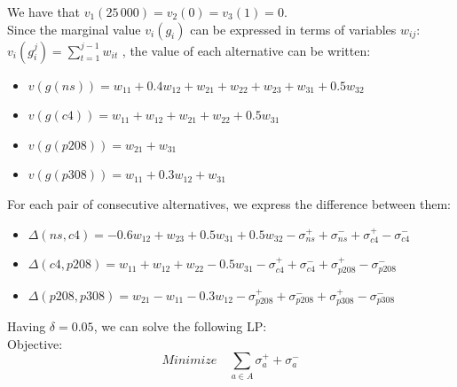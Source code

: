 \documentclass{report}
\begin{document}
We have that $v_1(25\,000) = v_2(0) = v_3(1) = 0$. \\
Since the marginal value $v_i(g_i)$ can be expressed in terms of variables $w_{ij}$: $v_i(g_i^{j}) = \sum _{t=1}^{j-1} w_{it}$ , the value of each alternative can be written: 
\begin{itemize}
\item $v(g(ns)) = w_{11} + 0.4w_{12} + w_{21} + w_{22} + w_{23} + w_{31} + 0.5w_{32}$
\item $v(g(c4)) = w_{11} + w_{12} + w_{21} + w_{22} + 0.5w_{31}$
\item $v(g(p208)) = w_{21} + w_{31} $
\item $v(g(p308)) = w_{11} + 0.3w_{12} + w_{31}$
\end{itemize}
For each pair of consecutive alternatives, we express the difference between them: 
\begin{itemize}
\item $\Delta (ns,c4) = -0.6w_{12} + w_{23} + 0.5w_{31} + 0.5w_{32} -\sigma _{ns}^{+} +\sigma _{ns}^{-} +\sigma _{c4}^{+} - \sigma _{c4}^{-} $
\item $\Delta (c4, p208) = w_{11} + w_{12} + w_{22} - 0.5w_{31} -\sigma _{c4}^{+} +\sigma _{c4}^{-} +\sigma _{p208}^{+} - \sigma _{p208}^{-} $
\item $\Delta (p208, p308) =w_{21} - w_{11} - 0.3w_{12} -\sigma _{p208}^{+} +\sigma _{p208}^{-} +\sigma _{p308}^{+} - \sigma _{p308}^{-} $
\end{itemize}
Having $\delta = 0.05$, we can solve the following LP:\\

Objective: 
\begin{equation}
Minimize \quad \sum_{a \in A} \sigma _{a}^{+} + \sigma _{a}^{-}
\end{equation}
\end{document}
